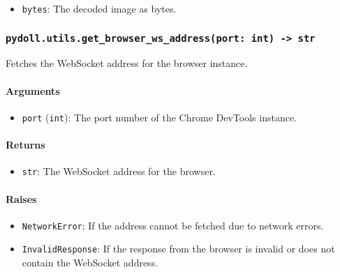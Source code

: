 \documentclass{article}
\begin{document}
\begin{itemize}
    \item \lstinline[style=pythonstyle]|bytes|: The decoded image as bytes.
\end{itemize}

\subsubsection*{\texttt{pydoll.utils.get\_browser\_ws\_address(port: int) -> str}}
\noindent Fetches the WebSocket address for the browser instance.

\paragraph{Arguments}

\begin{itemize}
    \item \lstinline[style=pythonstyle]|port| (\lstinline[style=pythonstyle]|int|): The port number of the Chrome DevTools instance.
\end{itemize}

\paragraph{Returns}

\begin{itemize}
    \item \lstinline[style=pythonstyle]|str|: The WebSocket address for the browser.
\end{itemize}

\paragraph{Raises}

\begin{itemize}
    \item \lstinline[style=pythonstyle]|NetworkError|: If the address cannot be fetched due to network errors.
    \item \lstinline[style=pythonstyle]|InvalidResponse|: If the response from the browser is invalid or does not contain the WebSocket address.
\end{itemize}
\end{document}
